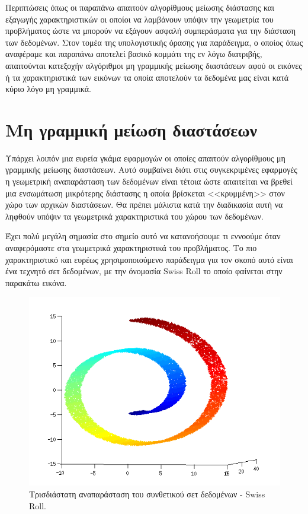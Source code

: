 \par
Περιπτώσεις όπως οι παραπάνω απαιτούν αλγορίθμους μείωσης διάστασης και εξαγωγής χαρακτηριστικών οι οποίοι να λαμβάνουν υπόψιν την γεωμετρία του προβλήματος ώστε να μπορούν να εξάγουν ασφαλή συμπεράσματα για την διάσταση των δεδομένων. Στον τομέα της υπολογιστικής όρασης για παράδειγμα, ο οποίος όπως αναφέραμε και παραπάνω αποτελεί βασικό κομμάτι της εν λόγω διατριβής, απαιτούνται κατεξοχήν αλγόριθμοι μη γραμμικής μείωσης διαστάσεων αφού οι εικόνες ή τα χαρακτηριστικά των εικόνων τα οποία αποτελούν τα δεδομένα μας είναι κατά κύριο λόγο μη γραμμικά. 

\section{Μη γραμμική μείωση διαστάσεων}
\par
Υπάρχει λοιπόν μια ευρεία γκάμα εφαρμογών οι οποίες απαιτούν αλγορίθμους μη γραμμικής μείωσης διαστάσεων. Αυτό συμβαίνει διότι στις συγκεκριμένες εφαρμογές η γεωμετρική αναπαράσταση των δεδομένων είναι τέτοια ώστε απαιτείται να βρεθεί μια ενσωμάτωση μικρότερης διάστασης η οποία βρίσκεται <<κρυμμένη>> στον χώρο των αρχικών διαστάσεων. Θα πρέπει μάλιστα κατά την διαδικασία αυτή να ληφθούν υπόψιν τα γεωμετρικά χαρακτηριστικά του χώρου των δεδομένων. 
\par
Έχει πολύ μεγάλη σημασία στο σημείο αυτό να κατανοήσουμε τι εννοούμε όταν αναφερόμαστε στα γεωμετρικά χαρακτηριστικά του προβλήματος. Το πιο χαρακτηριστικό και ευρέως χρησιμοποιούμενο παράδειγμα για τον σκοπό αυτό είναι ένα τεχνητό σετ δεδομένων, με την όνομασία \textlatin{Swiss Roll}\textlatin{\cite{swiss_roll}} το οποίο φαίνεται στην παρακάτω εικόνα. \\
\vspace{1.0cm}
\begin{figure}[h]
\centering
\includegraphics[scale=0.8]{figs/2.png}
\newline
\caption{ Τρισδιάστατη αναπαράσταση του συνθετικού σετ δεδομένων - \textlatin{Swiss Roll}.} 
\end{figure}
